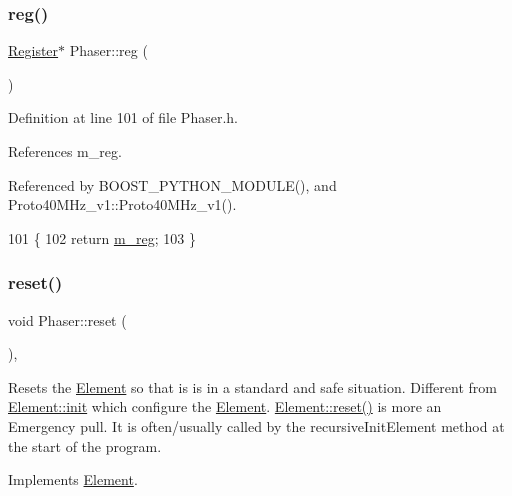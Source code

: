 \subsubsection{\texorpdfstring{reg()}{reg()}}
{\footnotesize\ttfamily \hyperlink{classRegister}{Register}$\ast$ Phaser\+::reg (\begin{DoxyParamCaption}{ }\end{DoxyParamCaption})\hspace{0.3cm}{\ttfamily [inline]}}



Definition at line 101 of file Phaser.\+h.



References m\+\_\+reg.



Referenced by B\+O\+O\+S\+T\+\_\+\+P\+Y\+T\+H\+O\+N\+\_\+\+M\+O\+D\+U\+L\+E(), and Proto40\+M\+Hz\+\_\+v1\+::\+Proto40\+M\+Hz\+\_\+v1().


\begin{DoxyCode}
101                  \{
102     \textcolor{keywordflow}{return} \hyperlink{classPhaser_ab6d751d77cb1e39723a6ac85d4cfec0c}{m\_reg};
103   \}
\end{DoxyCode}
\mbox{\label{classPhaser_a0d15908b0d50f60f4ce6c6d013f75611}} 
\subsubsection{\texorpdfstring{reset()}{reset()}}
{\footnotesize\ttfamily void Phaser\+::reset (\begin{DoxyParamCaption}{ }\end{DoxyParamCaption})\hspace{0.3cm}{\ttfamily [inline]}, {\ttfamily [virtual]}}

Resets the \hyperlink{classElement}{Element} so that is is in a standard and safe situation. Different from \hyperlink{classElement_af42754b5cabc198869222725218d695c}{Element\+::init} which configure the \hyperlink{classElement}{Element}. \hyperlink{classElement_a69efffa22f06909d768149715565cb56}{Element\+::reset()} is more an Emergency pull. It is often/usually called by the recursive\+Init\+Element method at the start of the program. 

Implements \hyperlink{classElement_a69efffa22f06909d768149715565cb56}{Element}.



